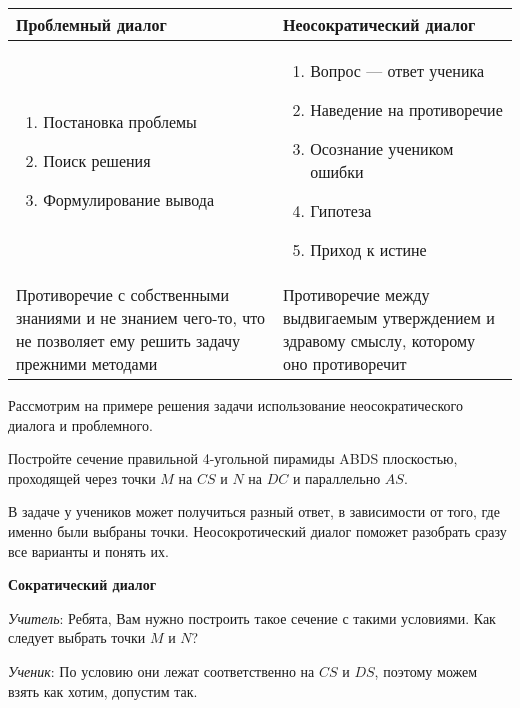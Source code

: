 \documentclass[a4paper,14pt,russian]{extreport}
\begin{document}
\begin {small}
\begin{tabularx}{0.8\textwidth} { 
  | >{\centering\arraybackslash}X 
  | >{\centering\arraybackslash}X| }
 \hline
 \textbf{Проблемный диалог} & \textbf{Неосократический диалог}  \\

\hline
\begin{enumerate}
    \item Постановка проблемы
    \item Поиск решения
    \item Формулирование вывода
\end{enumerate} 
&
\begin{enumerate}
    \item Вопрос — ответ ученика
    \item Наведение на противоречие
    \item Осознание учеником ошибки
    \item Гипотеза
    \item Приход к истине
\end{enumerate} \\
\hline
Противоречие с собственными знаниями и не знанием чего-то, что не позволяет ему решить задачу прежними методами & Противоречие между выдвигаемым утверждением и здравому смыслу, которому оно противоречит\\

 \hline
\end{tabularx}
\end{small}
\par
\vspace{2\baselineskip}
Рассмотрим на примере решения задачи использование неосократического диалога и проблемного.

Постройте сечение правильной 4-угольной пирамиды ABDS плоскостью, проходящей через точки $M$ на $CS$ и $N$ на $DC$ и параллельно $AS$.

В задаче у учеников может получиться разный ответ, в зависимости от того, где именно были выбраны точки. Неосокротический диалог поможет разобрать сразу все варианты и понять их.
\begin{center}
\textbf{Сократический диалог}    
\end{center}



\textit{Учитель}: Ребята, Вам нужно построить такое сечение с такими условиями. Как следует выбрать точки $M$ и $N$?

\textit{Ученик}: По условию они лежат соответственно на $CS$ и $DS$,  поэтому можем взять как хотим, допустим так.
\end{document}
